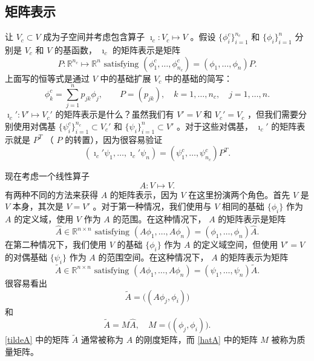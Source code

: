 \documentclass[12pt]{acta_2011xz}
\begin{document}
   \subsection{矩阵表示  }    让    $V_c\subset V$    成为子空间并考虑包含算子    $\imath_c:
V_c\mapsto V$    。假设    $ \{ \phi_i^c \} _{i=1}^{n_c}$    和    $ \{ \phi_i \} _{i=1}^n$    分别是    $V_c$    和    $V$    的基函数，   $\imath_c$    的矩阵表示是矩阵 
   \begin{equation}\label{defP}
P:\mathbb R^{n_c}\mapsto \mathbb R^n \mbox{ satisfying }
(\phi_1^c,\ldots, \phi_{n_c}^c)=(\phi_1,\ldots, \phi_n)P. 
\end{equation}    上面写的恒等式是通过    $V$    中的基础扩展    $V_c$    中的基础的简写：
   \begin{equation}\label{Pexpand}
\phi_k^c =\sum_{j=1}^n p_{jk} \phi_j, \quad \quad P=(p_{jk}),\quad k=1,\ldots, n_c, \quad j=1,\ldots,n.
\end{equation}       $\imath_c': V'\mapsto V_c'$    的矩阵表示是什么？虽然我们有    $V'=V$    和    $V_c'=V_c$    ，但我们需要分别使用对偶基 
   $ \{ \psi_i^c \} _{i=1}^{n_c}\subset V_c'$    和    $ \{ \psi_i \} _{i=1}^n\subset V'$    。对于这些对偶基，   $\imath_c'$    的矩阵表示就是    $P^T$   （   $P$    的转置），因为很容易验证
   $$
(\imath_c'\psi_1,\ldots, \imath_c'\psi_n)=(\psi_1^c,\ldots, \psi_{n_c}^c)P^T.
$$     

现在考虑一个线性算子 
   \begin{equation}
  \label{AVV}
A:V\mapsto V.
\end{equation}    有两种不同的方法来获得    $A$    的矩阵表示，因为    $V$    在这里扮演两个角色。首先    $V$    是    $V$    本身，其次是    $V=V'$    。对于第一种情况，我们使用与    $V$    相同的基础    $ \{ \phi_i \} $    作为    $A$    的定义域，使用    $V$    作为    $A$    的范围。在这种情况下，   $A$    的矩阵表示是矩阵 
   \begin{equation}
  \label{matrixrep0}
\hat A\in \mathbb R^{n\times n}\mbox{ satisfying }
(A\phi_1, \ldots, A\phi_n)  =(\phi_1, \ldots, \phi_n)\hat A. 
\end{equation}    在第二种情况下，我们使用    $V$    的基础    $ \{ \phi_i \} $    作为    $A$    的定义域空间，但使用    $V'=V$    的对偶基础    $ \{ \psi_i \} $    作为    $A$    的范围空间。在这种情况下，   $A$    的矩阵表示为矩阵 
   \begin{equation}
\label{matrixrep}
\tilde A\in \mathbb R^{n\times n}\mbox{ satisfying }
(A\phi_1, \ldots, A\phi_n)  =(\psi_1, \ldots, \psi_n)\tilde A. 
\end{equation}    很容易看出
   \begin{equation}
  \label{tildeA}
\tilde A=\bigg((A\phi_j,\phi_i)  \bigg)
\end{equation}    和
   \begin{equation}
  \label{hatA}
\tilde A=M\hat A, \quad M=\bigg((\phi_j,\phi_i)  \bigg).
\end{equation}       \eqref{tildeA}    中的矩阵    $\tilde A$    通常被称为    $A$    的刚度矩阵，而    \eqref{hatA}    中的矩阵    $M$    被称为质量矩阵。  
\end{document}
